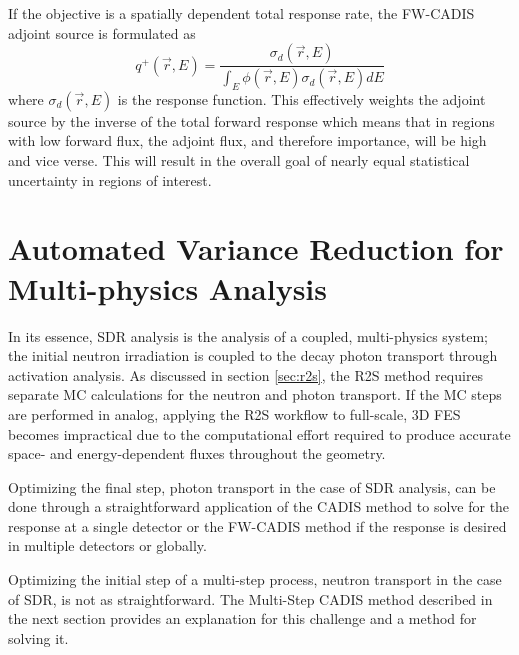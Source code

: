 If the objective is a spatially dependent total response rate, the FW-CADIS 
adjoint source is formulated as
\begin{equation}
	q^{+}(\overrightarrow{r}, E) = \frac{\sigma_d(\overrightarrow{r}, E)}
	{\int_E
	 {\phi(\overrightarrow{r}, E)\sigma_d(\overrightarrow{r}, E)} dE}
\end{equation}
where $\sigma_d(\overrightarrow{r}, E) $ is the response function.
This effectively weights the adjoint source by the inverse of %
the total forward response
which means that in regions with low forward flux, the adjoint flux, and therefore
importance, will be high and vice verse.  This will result in the overall goal of
nearly equal statistical uncertainty in regions of interest.  

\section{Automated Variance Reduction for Multi-physics Analysis}\label{sec:auto_vr_sdr}

In its essence, SDR analysis is the analysis of a coupled, multi-physics system;
the initial neutron irradiation is coupled to the decay photon transport
through activation analysis.
As discussed in section \ref{sec:r2s}, the R2S method requires separate MC calculations 
for the neutron and photon transport.  If the MC steps are performed in analog,
applying the R2S workflow to full-scale, 3D FES becomes impractical 
due to the computational effort required
to produce accurate space- and energy-dependent fluxes throughout the geometry.

Optimizing the final step, photon transport in the case of SDR analysis,  
can be done through a straightforward application of the CADIS method to solve 
for the response at a single detector or the FW-CADIS method if the response is desired
in multiple detectors or globally. 

Optimizing the initial step of a multi-step process, neutron transport in the case of SDR, is not as
straightforward.
The Multi-Step CADIS method described in the next section 
provides an explanation for this challenge and a method for solving it.  

